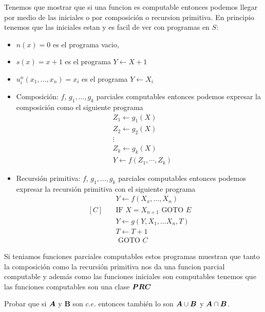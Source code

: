 \documentclass[leqno, 12pt, twoside,letterpaper]{book}
\begin{document}
\begin{solucion}
Tenemos que mostrar que si una funcion es computable entonces podemos llegar por medio de las iniciales o por composición o recursion primitiva.
En principio tenemos que las iniciales estan  y es facil de ver con programas en $S$:

\begin{itemize}
\renewcommand\labelitemi{$\sim$}
\item $n(x) = 0$ es el programa vacio,
\item $s(x) = x + 1$ es el programa   $Y \leftarrow X + 1  $
\item $u_i^n(x_1, \dots, x_n) = x_i$ es el programa $Y \leftarrow X_i  $
\item Composición: $f$, $g_1, \dots, g_k$ parciales computables entonces podemos expresar la composición como el siguiente programa
\begin{align*}
	 & Z_1 \leftarrow g_1(X) \\
	 & Z_2 \leftarrow g_2(X) \\
	 & \vdots \\
	 & Z_k \leftarrow g_k(X) \\
	 & Y \leftarrow f(Z_1, \cdots, Z_k)
\end{align*}
\item Recursión primitiva: $f$, $g_1, \dots, g_k$ parciales computables entonces podemos expresar la recursión primitiva con el siguiente programa
\begin{align*}
	    	  & Y \leftarrow f(X_x, \dots, X_n) \\
	[C] \quad & \mbox{IF } X = X_{n+1} \mbox{ GOTO } E \\
			  & Y \leftarrow g(Y, X_1, \dots X_n, T) \\
			  & T \leftarrow T + 1 \\
			  & \mbox{ GOTO } C
\end{align*}
\end{itemize}

\noindent Si teniamos funciones parciales computables estos programas muestran que tanto la composición como la recursión primitiva nos da una funcion parcial computable y además como las funciones iniciales son computables tenemos que las funciones computables son una clase $\bm{PRC}$
\end{solucion}

\begin{ej}{1}
    Probar que si $\bm{A}$ y $\bm{B}$ son $c.e.$ entonces también lo son $\bm{A} \cup
    \bm{B}$ y $\bm{A} \cap \bm{B}$.
\end{ej}
\end{document}

